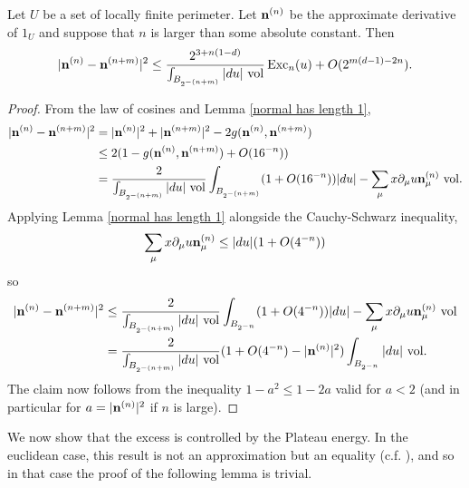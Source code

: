\begin{lemma} \label{excess bounds Cauchy sequence}
Let $U$ be a set of locally finite perimeter.
Let $\mathbf n^{(n)}$ be the approximate derivative of $1_U$ and suppose that $n$ is larger than some absolute constant. Then 
$$|\mathbf n^{(n)} - \mathbf n^{(n + m)}|^2 \leq \frac{2^{3 + n(1 - d)}}{\int_{B_{2^{-(n + m)}}} |du| ~\mathrm{vol}} \operatorname{Exc}_n(u) + O(2^{m(d - 1) - 2n}).$$
\end{lemma}
\begin{proof}
From the law of cosines and Lemma \ref{normal has length 1},
\begin{align*}
|\mathbf n^{(n)} - \mathbf n^{(n + m)}|^2 &= |\mathbf n^{(n)}|^2 + |\mathbf n^{(n + m)}|^2 - 2 g(\mathbf n^{(n)}, \mathbf n^{(n + m)})\\
&\leq 2(1 - g(\mathbf n^{(n)}, \mathbf n^{(n + m)}) + O(16^{-n})) \\
&= \frac{2}{\int_{B_{2^{-(n + m)}}} |du| ~\mathrm{vol}} \int_{B_{2^{-(n + m)}}} (1 + O(16^{-n}))|du| - \sum_\mu x \partial_\mu u \mathbf n_\mu^{(n)} ~\mathrm{vol}.
\end{align*}
Applying Lemma \ref{normal has length 1} alongside the Cauchy-Schwarz inequality,
$$\sum_\mu x \partial_\mu u \mathbf n_\mu^{(n)} \leq |du|(1 + O(4^{-n}))$$
so
\begin{align*}
|\mathbf n^{(n)} - \mathbf n^{(n + m)}|^2 &\leq \frac{2}{\int_{B_{2^{-(n + m)}}} |du| ~\mathrm{vol}} \int_{B_{2^{-n}}} (1 + O(4^{-n}))|du| - \sum_\mu x \partial_\mu u \mathbf n_\mu^{(n)} ~\mathrm{vol}\\
&= \frac{2}{\int_{B_{2^{-(n + m)}}} |du| ~\mathrm{vol}} (1 + O(4^{-n}) - |\mathbf n^{(n)}|^2) \int_{B_{2^{-n}}} |du| ~\mathrm{vol}.
\end{align*}
The claim now follows from the inequality $1 - a^2 \leq 1 - 2a$ valid for $a < 2$ (and in particular for $a = |\mathbf n^{(n)}|^2$ if $n$ is large).
\end{proof}

We now show that the excess is controlled by the Plateau energy.
In the euclidean case, this result is not an approximation but an equality (c.f. \cite[pg83]{Giusti77}), and so in that case the proof of the following lemma is trivial.

